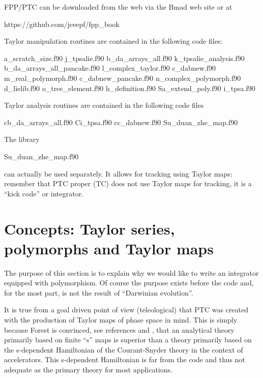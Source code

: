 \documentclass{hitec}     %
\newcommand{\Section}[1]{\section{#1}\vspace*{-1ex}}
\begin{document}
{{{FPP/PTC can be downloaded from the web via the Bmad web site\cite{b:bmad} or at
\begin{code}
https://github.com/jceepf/fpp_book
\end{code}

Taylor manipulation routines are contained in the following code files:
\begin{code}
a_scratch_size.f90                j_tpsalie.f90           
b_da_arrays_all.f90               k_tpsalie_analysis.f90
b_da_arrays_all_pancake.f90       l_complex_taylor.f90    
c_dabnew.f90                      m_real_polymorph.f90    
c_dabnew_pancake.f90              n_complex_polymorph.f90
d_lielib.f90                      o_tree_element.f90      
h_definition.f90                  Sa_extend_poly.f90     
i_tpsa.f90
\end{code}

Taylor analysis routines are contained in the following code files
\begin{code}
cb_da_arrays_all.f90               Ci_tpsa.f90
cc_dabnew.f90                      Su_duan_zhe_map.f90
\end{code}

{\color{h}
The library 
\begin{code}
             Su_duan_zhe_map.f90
\end{code}
can actually be used separately. It allows for   tracking using Taylor maps: remember that PTC proper (TC) does not use Taylor maps for tracking, it is a ``kick code'' or integrator.}
\Section{Concepts: Taylor series, polymorphs and Taylor maps}
\label{s:concepts}

The purpose of this section is to explain why we would like to write an integrator equipped with polymorphism. Of course the purpose exists before the code and, for the most part, is not the result of ``Darwinian evolution''. 


 It is true from a goal driven point of view (teleological) that PTC was created with  the production of Taylor maps of phase space in mind. This is simply because Forest is convinced, see references \cite{thebook} and \cite{thenewbook}, that an analytical theory primarily based on finite ``s'' maps is superior than a theory primarily based on the  s-dependent Hamiltonian of the Courant-Snyder theory in the context of accelerators. This s-dependent Hamiltonian is far from the code and thus not adequate as the primary theory for most applications. 
 
}}}
\end{document}
